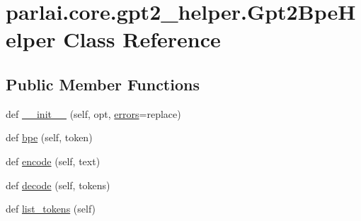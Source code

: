 \hypertarget{classparlai_1_1core_1_1gpt2__helper_1_1Gpt2BpeHelper}{}\section{parlai.\+core.\+gpt2\+\_\+helper.\+Gpt2\+Bpe\+Helper Class Reference}
\label{classparlai_1_1core_1_1gpt2__helper_1_1Gpt2BpeHelper}
\subsection*{Public Member Functions}
\begin{DoxyCompactItemize}
\item 
def \hyperlink{classparlai_1_1core_1_1gpt2__helper_1_1Gpt2BpeHelper_a5c9324bab66b00f6f977aef0241927bd}{\+\_\+\+\_\+init\+\_\+\+\_\+} (self, opt, \hyperlink{classparlai_1_1core_1_1gpt2__helper_1_1Gpt2BpeHelper_a0ea9f7588f25a62eb6021a54ea8ca095}{errors}=\textquotesingle{}replace\textquotesingle{})
\item 
def \hyperlink{classparlai_1_1core_1_1gpt2__helper_1_1Gpt2BpeHelper_ac2bbb343b37bc277bf717b87ed675ff9}{bpe} (self, token)
\item 
def \hyperlink{classparlai_1_1core_1_1gpt2__helper_1_1Gpt2BpeHelper_a7c5c94aa8d5acd15215cf3e45fc9f2c3}{encode} (self, text)
\item 
def \hyperlink{classparlai_1_1core_1_1gpt2__helper_1_1Gpt2BpeHelper_a54e448f943687a8afe9bcc97741d06b9}{decode} (self, tokens)
\item 
def \hyperlink{classparlai_1_1core_1_1gpt2__helper_1_1Gpt2BpeHelper_a36f3a5cb4264010b4891605508147442}{list\+\_\+tokens} (self)
\end{DoxyCompactItemize}
